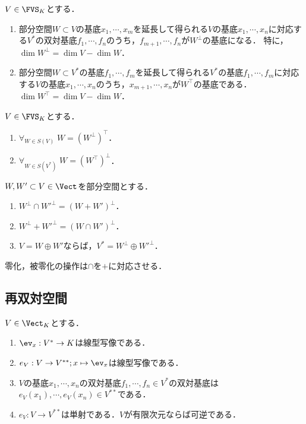 \documentclass[uplatex, dvipdfmx]{jsreport}
\begin{document}
\begin{lemma}[基底の対応]
    $V\in\FVS_K$とする．
    \begin{enumerate}
        \item 部分空間$W\subset V$の基底$x_1,\cdots,x_m$を延長して得られる$V$の基底$x_1,\cdots,x_n$に対応する$V^*$の双対基底$f_1,\cdots,f_n$のうち，$f_{m+1},\cdots,f_n$が$W^\perp$の基底になる．
        特に，$\dim W^\perp=\dim V-\dim W$．
        \item 部分空間$W\subset V^*$の基底$f_1,\cdots,f_m$を延長して得られる$V^*$の基底$f_1,\cdots,f_m$に対応する$V$の基底$x_1,\cdots,x_n$のうち，$x_{m+1},\cdots,x_n$が$W^\top$の基底である．
        $\dim W^\top=\dim V-\dim W$．
    \end{enumerate}
\end{lemma}

\begin{corollary}[TVSでは再零化空間は元に戻る]
    $V\in\FVS_K$とする．
    \begin{enumerate}
        \item $\forall_{W\in S(V)}\;W=(W^\perp)^\top$．
        \item $\forall_{W\in S(V^*)}\;W=(W^\top)^\perp$．
    \end{enumerate}
\end{corollary}

\begin{proposition}[双対空間の零化空間への分解]\label{prop-annihilator-space-and-direct-sum}
    $W,W'\subset V\in\Vect$を部分空間とする．
    \begin{enumerate}
        \item $W^\bot\cap W'^\bot=(W+W')^\bot$．
        \item $W^\bot+W'^\bot=(W\cap W')^\bot$．
        \item $V=W\oplus W'$ならば，$V^*=W^\bot\oplus W'^\bot$．
    \end{enumerate}
\end{proposition}
\begin{remarks}
    零化，被零化の操作は$\cap$を$+$に対応させる．
\end{remarks}

\subsection{再双対空間}

\begin{lemma}[再双対空間の基底の対応]\label{prop-eV-is-monic}
    $V\in\Vect_K$とする．
    \begin{enumerate}
        \item $\ev_x:V^*\to K$は線型写像である．
        \item $e_V:V\to V^{**};x\mapsto \ev_x$は線型写像である．
        \item $V$の基底$x_1,\cdots,x_n$の双対基底$f_1,\cdots,f_n\in V^*$の双対基底は$e_V(x_1),\cdots,e_V(x_n)\in V^{**}$である．
        \item $e_V:V\to V^{**}$は単射である．$V$が有限次元ならば可逆である．
    \end{enumerate}
\end{lemma}
\end{document}
